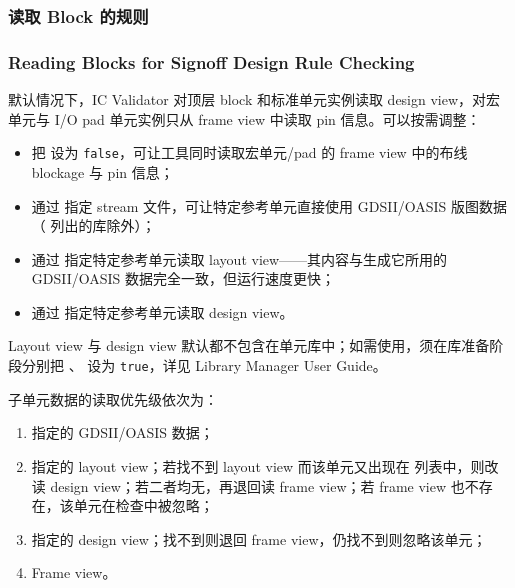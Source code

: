 \subsubsection{读取 Block 的规则}
\subsubsection*{Reading Blocks for Signoff Design Rule Checking}

默认情况下，IC Validator 对顶层 block 和标准单元实例读取 design view，对宏单元与 I/O pad 单元实例只从 frame view 中读取 pin 信息。可以按需调整：
\begin{itemize}
  \item 把  设为 \texttt{false}，可让工具同时读取宏单元/pad 的 frame view 中的布线 blockage 与 pin 信息；
  \item 通过  指定 stream 文件，可让特定参考单元直接使用 GDSII/OASIS 版图数据（ 列出的库除外）；
  \item 通过  指定特定参考单元读取 layout view——其内容与生成它所用的 GDSII/OASIS 数据完全一致，但运行速度更快；
  \item 通过  指定特定参考单元读取 design view。
\end{itemize}

\begin{noteBox}
Layout view 与 design view 默认都不包含在单元库中；如需使用，须在库准备阶段分别把 、 设为 \texttt{true}，详见 Library Manager User Guide。
\end{noteBox}

子单元数据的读取优先级依次为：
\begin{enumerate}
  \item {} 指定的 GDSII/OASIS 数据；
  \item {} 指定的 layout view；若找不到 layout view 而该单元又出现在  列表中，则改读 design view；若二者均无，再退回读 frame view；若 frame view 也不存在，该单元在检查中被忽略；
  \item {} 指定的 design view；找不到则退回 frame view，仍找不到则忽略该单元；
  \item Frame view。
\end{enumerate}

